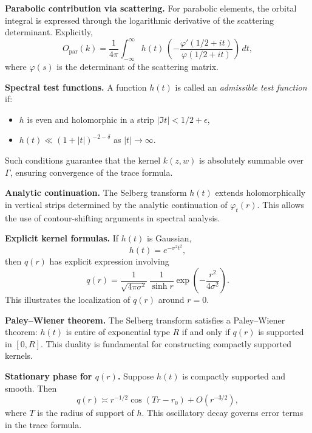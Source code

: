 \medskip

\noindent\textbf{Parabolic contribution via scattering.}
For parabolic elements,
the orbital integral is expressed through the logarithmic derivative of the scattering determinant.
Explicitly,
\[
  O_{\mathrm{par}}(k)
  = \frac{1}{4\pi}\int_{-\infty}^{\infty} h(t)\,
    \left(-\frac{\varphi'(1/2+it)}{\varphi(1/2+it)}\right)\,dt,
\]
where $\varphi(s)$ is the determinant of the scattering matrix.

\medskip

\noindent\textbf{Spectral test functions.}
A function $h(t)$ is called an \emph{admissible test function} if:
\begin{itemize}
  \item $h$ is even and holomorphic in a strip $|\Im t|<1/2+\epsilon$,
  \item $h(t)\ll (1+|t|)^{-2-\delta}$ as $|t|\to\infty$.
\end{itemize}
Such conditions guarantee that the kernel $k(z,w)$ is absolutely summable over $\Gamma$,
ensuring convergence of the trace formula.

\medskip

\noindent\textbf{Analytic continuation.}
The Selberg transform $h(t)$ extends holomorphically
in vertical strips determined by the analytic continuation of $\varphi_{t}(r)$.
This allows the use of contour-shifting arguments in spectral analysis.

\medskip

\noindent\textbf{Explicit kernel formulas.}
If $h(t)$ is Gaussian,
\[
  h(t) = e^{-\sigma^{2}t^{2}},
\]
then $q(r)$ has explicit expression involving
\[
  q(r) = \frac{1}{\sqrt{4\pi\sigma^{2}}} \, \frac{1}{\sinh r}
  \exp\!\left(-\frac{r^{2}}{4\sigma^{2}}\right).
\]
This illustrates the localization of $q(r)$ around $r=0$.

\medskip

\noindent\textbf{Paley–Wiener theorem.}
The Selberg transform satisfies a Paley–Wiener theorem:
$h(t)$ is entire of exponential type $R$
if and only if $q(r)$ is supported in $[0,R]$.
This duality is fundamental for constructing compactly supported kernels.

\medskip

\noindent\textbf{Stationary phase for $q(r)$.}
Suppose $h(t)$ is compactly supported and smooth.
Then
\[
  q(r) \asymp r^{-1/2}\cos(Tr-r_{0}) + O(r^{-3/2}),
\]
where $T$ is the radius of support of $h$.
This oscillatory decay governs error terms in the trace formula.

